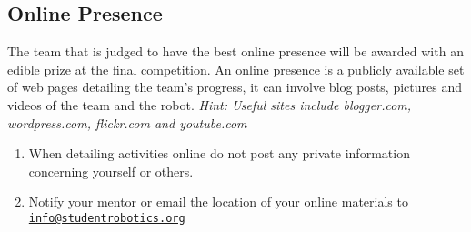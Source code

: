\subsection{Online Presence}
The team that is judged to have the best online presence will be awarded with an edible prize at the final competition.
 An online presence is a publicly available set of web pages detailing the team's progress, it can involve blog posts, pictures and videos of the team and the robot.
 \emph{Hint: Useful sites include blogger.com, wordpress.com, flickr.com and youtube.com}
\begin{enumerate}
\item When detailing activities online do not post any private information concerning yourself or others.
\item Notify your mentor or email the location of your online materials to \linebreak\href{mailto:info@studentrobotics.org}{\nolinkurl{info@studentrobotics.org}}
\end{enumerate}
